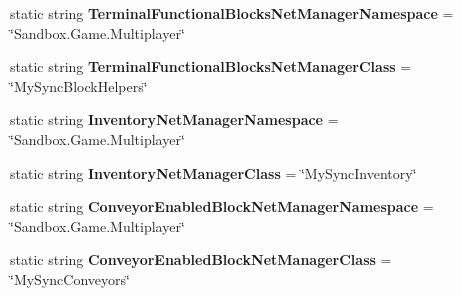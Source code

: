 \begin{DoxyCompactItemize}
\item 
\hypertarget{class_s_e_mod_a_p_i_internal_1_1_a_p_i_1_1_common_1_1_network_manager_a664aed01be750c1675c0074ae96c7ae5}{}static string {\bfseries Terminal\+Functional\+Blocks\+Net\+Manager\+Namespace} = \char`\"{}Sandbox.\+Game.\+Multiplayer\char`\"{}\label{class_s_e_mod_a_p_i_internal_1_1_a_p_i_1_1_common_1_1_network_manager_a664aed01be750c1675c0074ae96c7ae5}

\item 
\hypertarget{class_s_e_mod_a_p_i_internal_1_1_a_p_i_1_1_common_1_1_network_manager_a6a8a1f538e0d8924087b0d51578f06e2}{}static string {\bfseries Terminal\+Functional\+Blocks\+Net\+Manager\+Class} = \char`\"{}My\+Sync\+Block\+Helpers\char`\"{}\label{class_s_e_mod_a_p_i_internal_1_1_a_p_i_1_1_common_1_1_network_manager_a6a8a1f538e0d8924087b0d51578f06e2}

\item 
\hypertarget{class_s_e_mod_a_p_i_internal_1_1_a_p_i_1_1_common_1_1_network_manager_a8f52dc381d0c1364e8d75ed3e5b0a87e}{}static string {\bfseries Inventory\+Net\+Manager\+Namespace} = \char`\"{}Sandbox.\+Game.\+Multiplayer\char`\"{}\label{class_s_e_mod_a_p_i_internal_1_1_a_p_i_1_1_common_1_1_network_manager_a8f52dc381d0c1364e8d75ed3e5b0a87e}

\item 
\hypertarget{class_s_e_mod_a_p_i_internal_1_1_a_p_i_1_1_common_1_1_network_manager_a37c4e599d525cc836f31f68244787cbd}{}static string {\bfseries Inventory\+Net\+Manager\+Class} = \char`\"{}My\+Sync\+Inventory\char`\"{}\label{class_s_e_mod_a_p_i_internal_1_1_a_p_i_1_1_common_1_1_network_manager_a37c4e599d525cc836f31f68244787cbd}

\item 
\hypertarget{class_s_e_mod_a_p_i_internal_1_1_a_p_i_1_1_common_1_1_network_manager_a55f50d883de9263b0d504b85c4818591}{}static string {\bfseries Conveyor\+Enabled\+Block\+Net\+Manager\+Namespace} = \char`\"{}Sandbox.\+Game.\+Multiplayer\char`\"{}\label{class_s_e_mod_a_p_i_internal_1_1_a_p_i_1_1_common_1_1_network_manager_a55f50d883de9263b0d504b85c4818591}

\item 
\hypertarget{class_s_e_mod_a_p_i_internal_1_1_a_p_i_1_1_common_1_1_network_manager_adb2157042701f9d919e4a8c4e4ac1cdf}{}static string {\bfseries Conveyor\+Enabled\+Block\+Net\+Manager\+Class} = \char`\"{}My\+Sync\+Conveyors\char`\"{}\label{class_s_e_mod_a_p_i_internal_1_1_a_p_i_1_1_common_1_1_network_manager_adb2157042701f9d919e4a8c4e4ac1cdf}


\end{DoxyCompactItemize}
